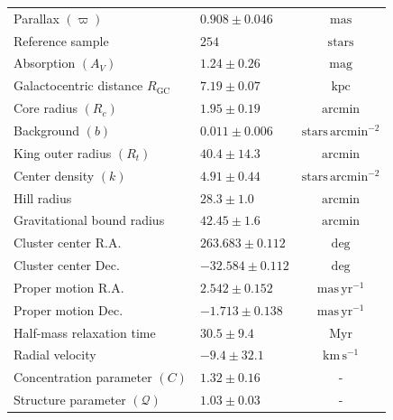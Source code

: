 \documentclass{aa}
\begin{document}
\begin{table}
{\begin{tabular}{llc}
			Parallax $(\varpi)$                     & $0.908 \pm 0.046$   & $\mathrm{mas}$                     \\
			Reference sample                        & $254$               & $\mathrm{stars}$                   \\
			Absorption $(A_V)$                      & $1.24 \pm 0.26$   & $\mathrm{mag}$                     \\
			Galactocentric distance $R_\mathrm{GC}$ & $7.19 \pm 0.07$             & $\mathrm{kpc}$                     \\
			Core radius $(R_c)$                     & $1.95 \pm 0.19$  & $\mathrm{arcmin}$                  \\
			Background $(b)$                        & $0.011 \pm 0.006$  & $\mathrm{stars\,arcmin^{-2}}$      \\
			King outer radius $(R_t)$               & $40.4 \pm 14.3$ & $\mathrm{arcmin}$                  \\
			Center density $(k)$                    & $4.91 \pm 0.44$   & $\mathrm{stars\,arcmin^{-2}}$      \\
			Hill radius                             & $28.3 \pm 1.0$            & $\mathrm{arcmin}$                  \\
			Gravitational bound radius              & $42.45 \pm 1.6$            & $\mathrm{arcmin}$                  \\
			Cluster center R.A.                     & $263.683 \pm 0.112$ & $\mathrm{deg}$                     \\
			Cluster center Dec.                     & $-32.584 \pm 0.112$ & $\mathrm{deg}$                     \\
			Proper motion R.A.                      & $2.542 \pm 0.152$  & $\mathrm{mas\,yr^{-1}}$            \\
			Proper motion Dec.                      & $-1.713 \pm 0.138$ & $\mathrm{mas\,yr^{-1}}$            \\
			Half-mass relaxation time               & $30.5 \pm 9.4$             & $\mathrm{Myr}$                     \\
			Radial velocity                         & $-9.4 \pm 32.1$  & $\mathrm{km\,s^{-1}}$              \\
			Concentration parameter $(C)$           & $1.32 \pm 0.16$    & -                                  \\
			Structure parameter $(\mathcal{Q})$     & $1.03 \pm 0.03$    & -                                  \\

\end{tabular}}
\end{table}
\end{document}
